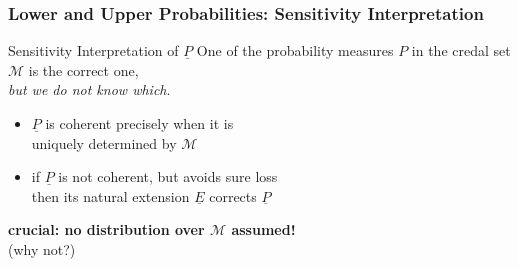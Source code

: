 \documentclass{beamer}
\newcommand{\pr}{P}
\newcommand{\lpr}{\underline{P}}
\newcommand{\lnex}{\underline{E}}
\begin{document}
\begin{frame}
  \frametitle{Lower and Upper Probabilities: Sensitivity Interpretation}
  \begin{block}{Sensitivity Interpretation of $\lpr$}
    One of the probability measures $\pr$ in the credal set $\mathcal{M}$ is
    the correct one,
    \\
    \textit{but we do not know which}.
  \end{block}
  \begin{itemize}
  \item $\lpr$ is coherent precisely when it is
    \\ \alert{uniquely determined} by $\mathcal{M}$
  \item if $\lpr$ is not coherent, but avoids sure loss
    \\
    then its natural extension $\lnex$ \alert{corrects} $\lpr$
  \end{itemize}
  \begin{center}
    \textbf{crucial: no distribution over $\mathcal{M}$ assumed!} \\
    (why not?)
  \end{center}
\end{frame}
\end{document}
